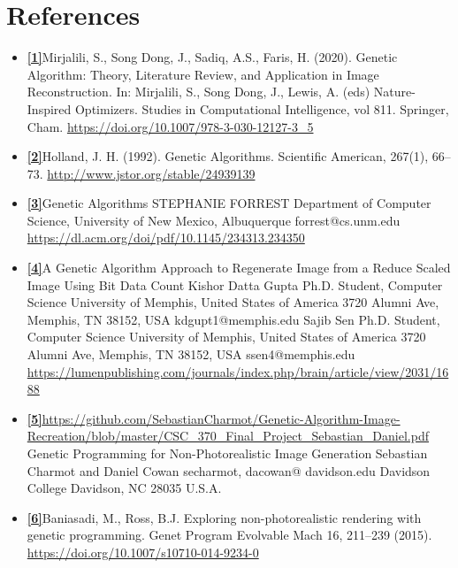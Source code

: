 \documentclass[10pt, conference]{IEEEtran}
\begin{document}
\section{References}
\begin{itemize}
	\item \textbf{\hyperref[sec:1]{[1]}\label{sec:1r}}Mirjalili, S., Song Dong, J., Sadiq, A.S., Faris, H. (2020). Genetic Algorithm: Theory, Literature Review, and Application in Image Reconstruction. In: Mirjalili, S., Song Dong, J., Lewis, A. (eds) Nature-Inspired Optimizers. Studies in Computational Intelligence, vol 811. Springer, Cham.
	      \url{https://doi.org/10.1007/978-3-030-12127-3_5}

	\item \textbf{\hyperref[sec:2]{[2]}\label{sec:2r}}Holland, J. H. (1992). Genetic Algorithms. Scientific American, 267(1), 66–73. \url{http://www.jstor.org/stable/24939139}
	\item \textbf{\hyperref[sec:3]{[3]}\label{sec:3r}}Genetic Algorithms
	      STEPHANIE FORREST
	      Department of Computer Science, University of New Mexico, Albuquerque forrest@cs.unm.edu
	      \url{https://dl.acm.org/doi/pdf/10.1145/234313.234350}
	\item \textbf{\hyperref[sec:4]{[4]}\label{sec:4r}}A Genetic Algorithm Approach to Regenerate Image from a Reduce Scaled Image Using Bit Data Count Kishor Datta Gupta Ph.D. Student, Computer Science University of Memphis, United States of America 3720 Alumni Ave, Memphis, TN 38152, USA kdgupt1@memphis.edu Sajib Sen Ph.D. Student, Computer Science University of Memphis, United States of America 3720 Alumni Ave, Memphis, TN 38152, USA ssen4@memphis.edu \url{https://lumenpublishing.com/journals/index.php/brain/article/view/2031/1688}

	\item \textbf{\hyperref[sec:5]{[5]}\label{sec:5r}}\url{https://github.com/SebastianCharmot/Genetic-Algorithm-Image-Recreation/blob/master/CSC_370_Final_Project_Sebastian_Daniel.pdf}
	      Genetic Programming for Non-Photorealistic Image Generation
	      Sebastian Charmot and Daniel Cowan
	      secharmot,
	      dacowan@
	      davidson.edu
	      Davidson College
	      Davidson, NC 28035
	      U.S.A.

	\item \textbf{\hyperref[sec:6]{[6]}\label{sec:6r}}Baniasadi, M., Ross, B.J. Exploring non-photorealistic rendering with genetic programming. Genet Program Evolvable Mach 16, 211–239 (2015). \url{https://doi.org/10.1007/s10710-014-9234-0}


\end{itemize}
\end{document}
